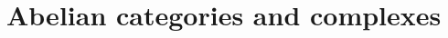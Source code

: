 \documentclass[../../../main]{subfiles}
\begin{document}
\chapter{Abelian categories and complexes}






\end{document}
